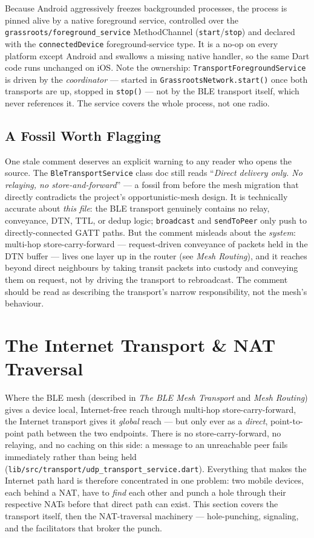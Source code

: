 \documentclass[11pt]{report}
\newcommand{\code}[1]{\texttt{\small #1}}
\begin{document}
Because Android aggressively freezes backgrounded processes, the process is pinned alive by a native foreground service, controlled over the \code{grassroots/foreground_service} MethodChannel (\code{start}/\code{stop}) and declared with the \code{connectedDevice} foreground-service type. It is a no-op on every platform except Android and swallows a missing native handler, so the same Dart code runs unchanged on iOS. Note the ownership: \code{TransportForegroundService} is driven by the \emph{coordinator} --- started in \code{GrassrootsNetwork.start()} once both transports are up, stopped in \code{stop()} --- not by the BLE transport itself, which never references it. The service covers the whole process, not one radio.

\subsection{A Fossil Worth Flagging}

One stale comment deserves an explicit warning to any reader who opens the source. The \code{BleTransportService} class doc still reads ``\emph{Direct delivery only. No relaying, no store-and-forward}'' --- a fossil from before the mesh migration that directly contradicts the project's opportunistic-mesh design. It is technically accurate about \emph{this file}: the BLE transport genuinely contains no relay, conveyance, DTN, TTL, or dedup logic; \code{broadcast} and \code{sendToPeer} only push to directly-connected GATT paths. But the comment misleads about the \emph{system}: multi-hop store-carry-forward --- request-driven conveyance of packets held in the DTN buffer --- lives one layer up in the router (see \emph{Mesh Routing}), and it reaches beyond direct neighbours by taking transit packets into custody and conveying them on request, not by driving the transport to rebroadcast. The comment should be read as describing the transport's narrow responsibility, not the mesh's behaviour.

\section{The Internet Transport \& NAT Traversal}

Where the BLE mesh (described in \emph{The BLE Mesh Transport} and \emph{Mesh Routing}) gives a device local, Internet-free reach through multi-hop store-carry-forward, the Internet transport gives it \emph{global} reach --- but only ever as a \emph{direct}, point-to-point path between the two endpoints. There is no store-carry-forward, no relaying, and no caching on this side: a message to an unreachable peer fails immediately rather than being held (\code{lib/src/transport/udp_transport_service.dart}). Everything that makes the Internet path hard is therefore concentrated in one problem: two mobile devices, each behind a NAT, have to \emph{find} each other and punch a hole through their respective NATs before that direct path can exist. This section covers the transport itself, then the NAT-traversal machinery --- hole-punching, signaling, and the facilitators that broker the punch.
\end{document}
